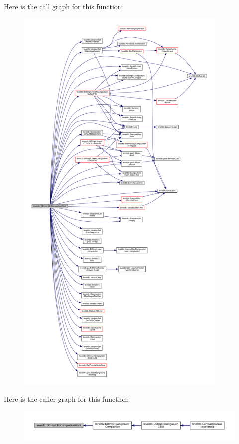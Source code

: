 Here is the call graph for this function\+:\nopagebreak
\begin{figure}[H]
\begin{center}
\leavevmode
\includegraphics[height=550pt]{classleveldb_1_1_d_b_impl_a9b86cb14563a0e4b780d167f3c0623ac_cgraph}
\end{center}
\end{figure}




Here is the caller graph for this function\+:\nopagebreak
\begin{figure}[H]
\begin{center}
\leavevmode
\includegraphics[width=350pt]{classleveldb_1_1_d_b_impl_a9b86cb14563a0e4b780d167f3c0623ac_icgraph}
\end{center}
\end{figure}


